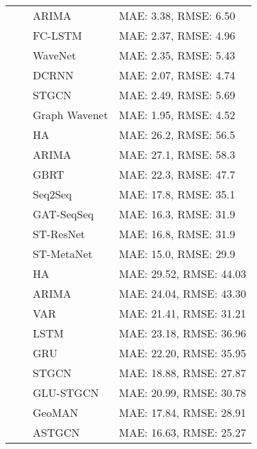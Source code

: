 \documentclass[ugmskripsi]{ugmskripsi}
\begin{document}
\begin{longtable}{|p{3.8cm}|p{3.8cm}|l|l|}
& 
& ARIMA & MAE: 3.38, RMSE: 6.50 \\
 &  & FC-LSTM & MAE: 2.37, RMSE: 4.96 \\
 &  & WaveNet &  MAE: 2.35, RMSE: 5.43 \\
 &  & DCRNN &  MAE: 2.07, RMSE: 4.74 \\ 
 &  & STGCN & MAE: 2.49, RMSE: 5.69  \\ 
 &  & Graph Wavenet & MAE: 1.95, RMSE: 4.52 \\
\hline


& 
& HA & MAE: 26.2, RMSE: 56.5 \\
 &  & ARIMA & MAE: 27.1, RMSE: 58.3 \\
 &  & GBRT &  MAE: 22.3, RMSE: 47.7 \\
 &  & Seq2Seq &  MAE: 17.8, RMSE: 35.1 \\ 
 &  & GAT-SeqSeq & MAE: 16.3, RMSE: 31.9  \\ 
  &  & ST-ResNet & MAE: 16.8, RMSE: 31.9  \\ 
 &  & ST-MetaNet & MAE: 15.0, RMSE: 29.9 \\
\hline


& 
& HA & MAE: 29.52, RMSE: 44.03 \\
 &  & ARIMA & MAE: 24.04, RMSE: 43.30 \\
 &  & VAR &  MAE: 21.41, RMSE: 31.21 \\
 &  & LSTM &  MAE: 23.18, RMSE: 36.96 \\ 
 &  & GRU & MAE: 22.20, RMSE: 35.95  \\ 
  &  & STGCN & MAE: 18.88, RMSE: 27.87  \\ 
 &  & GLU-STGCN & MAE: 20.99, RMSE: 30.78 \\
&  & GeoMAN & MAE: 17.84, RMSE: 28.91 \\
&  & ASTGCN & MAE: 16.63, RMSE: 25.27 \\
\hline


\end{longtable}
\end{document}
